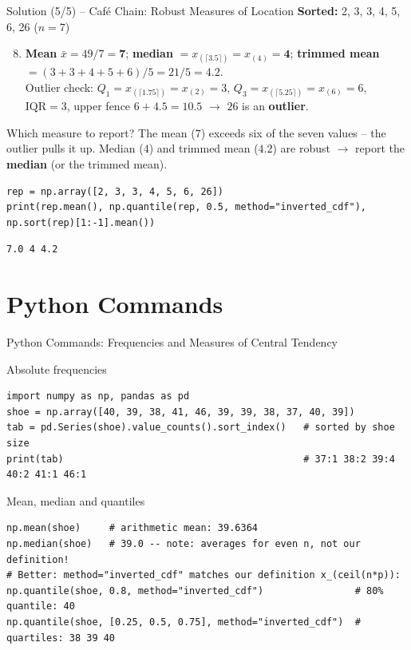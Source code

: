 \documentclass[aspectratio=169,11pt]{beamer}
\begin{document}
\begin{frame}[fragile]{Solution (5/5) -- Caf\'e Chain: Robust Measures of Location}
  \textbf{Sorted:} 2, 3, 3, 4, 5, 6, 26 \quad ($n = 7$)
  \begin{enumerate}\setcounter{enumi}{7}
    \item \textbf{Mean} $\bar{x} = 49/7 = \mathbf{7}$; \quad
          \textbf{median} $= x_{(\lceil 3.5 \rceil)} = x_{(4)} = \mathbf{4}$; \quad
          \textbf{trimmed mean} $= (3+3+4+5+6)/5 = 21/5 = \mathbf{4.2}$.\\[2pt]
          Outlier check: $Q_1 = x_{(\lceil 1.75 \rceil)} = x_{(2)} = 3$,
          $Q_3 = x_{(\lceil 5.25 \rceil)} = x_{(6)} = 6$, $\text{IQR} = 3$,
          upper fence $6 + 4.5 = 10.5$ $\rightarrow$ $26$ is an \textbf{outlier}.
  \end{enumerate}
  \begin{alertblock}{Which measure to report?}
    The mean ($7$) exceeds six of the seven values -- the outlier pulls it up.
    Median ($4$) and trimmed mean ($4.2$) are robust $\rightarrow$ report the
    \textbf{median} (or the trimmed mean).
  \end{alertblock}
  \begin{lstlisting}
rep = np.array([2, 3, 3, 4, 5, 6, 26])
print(rep.mean(), np.quantile(rep, 0.5, method="inverted_cdf"), np.sort(rep)[1:-1].mean())
  \end{lstlisting}
  \begin{lstlisting}[style=Pyout]
7.0 4 4.2
  \end{lstlisting}
\end{frame}

\section[Python]{Python Commands}
\begin{frame}[fragile]{Python Commands: Frequencies and Measures of Central Tendency}
  \begin{block}{Absolute frequencies}
    \begin{lstlisting}
import numpy as np, pandas as pd
shoe = np.array([40, 39, 38, 41, 46, 39, 39, 38, 37, 40, 39])
tab = pd.Series(shoe).value_counts().sort_index()   # sorted by shoe size
print(tab)                                          # 37:1 38:2 39:4 40:2 41:1 46:1
    \end{lstlisting}
  \end{block}
  \begin{block}{Mean, median and quantiles}
    \begin{lstlisting}
np.mean(shoe)     # arithmetic mean: 39.6364
np.median(shoe)   # 39.0 -- note: averages for even n, not our definition!
# Better: method="inverted_cdf" matches our definition x_(ceil(n*p)):
np.quantile(shoe, 0.8, method="inverted_cdf")                # 80% quantile: 40
np.quantile(shoe, [0.25, 0.5, 0.75], method="inverted_cdf")  # quartiles: 38 39 40
    \end{lstlisting}
  \end{block}
\end{frame}
\end{document}
